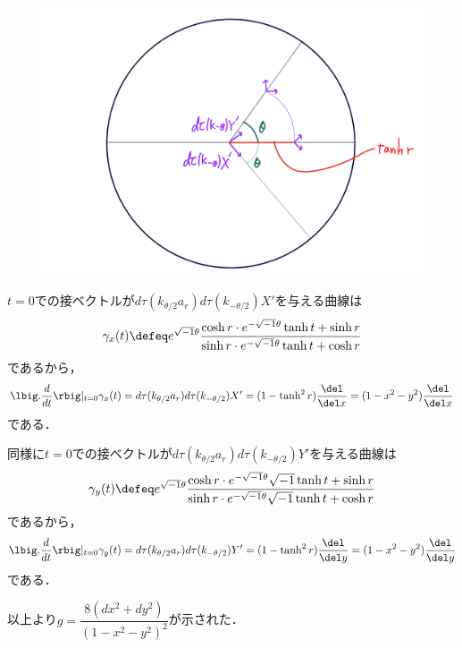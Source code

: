 \begin{pfwn}{}
\begin{figure}[H]
  \centering
  \includegraphics[scale=0.08]{../graph/riem-su11.png}
  \caption{}
  \label{fig:riem-metric-su11}
\end{figure}


$t = 0$での接ベクトルが$d\tau(k_{\theta/2}a_r)d\tau(k_{-\theta/2})X'$を与える曲線は
\begin{align*}
  \gamma_x(t) \defeq  e^{\sqrt{-1} \theta}\dfrac{\cosh r\cdot e^{-\sqrt{-1}\theta} \tanh t + \sinh r }{\sinh r\cdot e^{-\sqrt{-1}\theta} \tanh t + \cosh r}
\end{align*}
であるから，
\begin{align*}
  \lbig.\dfrac{d}{dt}\rbig|_{t=0}\gamma_x(t) = d\tau(k_{\theta/2}a_r)d\tau(k_{-\theta/2})X' = (1 - \tanh^2 r)\dfrac{\del}{\del x} = (1-x^2-y^2)\dfrac{\del}{\del x}
\end{align*}
である．

同様に$t = 0$での接ベクトルが$d\tau(k_{\theta/2}a_r)d\tau(k_{-\theta/2})Y'$を与える曲線は
\begin{align*}
\gamma_y(t) \defeq  e^{\sqrt{-1} \theta}\dfrac{\cosh r\cdot e^{-\sqrt{-1}\theta}\sqrt{-1} \tanh t + \sinh r }{\sinh r\cdot e^{-\sqrt{-1}\theta}\sqrt{-1} \tanh t + \cosh r}
\end{align*}
であるから，
\begin{align*}
\lbig.\dfrac{d}{dt}\rbig|_{t=0}\gamma_y(t) = d\tau(k_{\theta/2}a_r)d\tau(k_{-\theta/2})Y' = (1 - \tanh^2 r)\dfrac{\del}{\del y} = (1-x^2-y^2)\dfrac{\del}{\del y}
\end{align*}
である．

以上より$g  =  \dfrac{8(dx^2 + dy^2)}{(1 - x^2 - y^2)^2} $が示された．

\end{pfwn}


